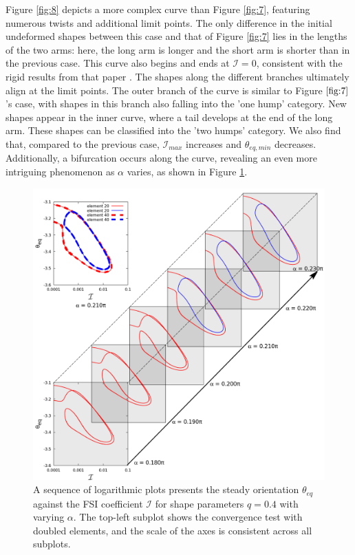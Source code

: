 \documentclass[12pt,MSc,twoside]{muthesis_2020}
\begin{document}
Figure \ref{fig:8} depicts a more complex curve than Figure \ref{fig:7}, featuring numerous twists and additional limit points. The only difference in the initial undeformed shapes between this case and that of Figure \ref{fig:7} lies in the lengths of the two arms: here, the long arm is longer and the short arm is shorter than in the previous case. This curve also begins and ends at $\mathcal{I}=0$, consistent with the rigid results from that paper \cite{roggeveen2022motion}. The shapes along the different branches ultimately align at the limit points. The outer branch of the curve is similar to Figure $\ref{fig:7}$'s case, with shapes in this branch also falling into the 'one hump' category. New shapes appear in the inner curve, where a tail develops at the end of the long arm. These shapes can be classified into the 'two humps' category. We also find that, compared to the previous case, $\mathcal{I}_{max}$ increases and $\theta_{eq,min}$ decreases. Additionally, a bifurcation occurs along the curve, revealing an even more intriguing phenomenon as $\alpha$ varies, as shown in Figure \ref{fig:9}.
\begin{figure}[!h]
	\begin{center}
		\includegraphics[width=1\textwidth]{plot/elastic_beam_I_theta_q_0.400_alpha.png}
		\caption{A sequence of logarithmic plots presents the steady orientation $\theta_{eq}$ against the FSI coefficient $\mathcal{I}$ for shape parameters $q = 0.4$ with varying $\alpha$. The top-left subplot shows the convergence test with doubled elements, and the scale of the axes is consistent across all subplots.}
   \label{fig:9}
   \end{center}
\end{figure}
\end{document}
